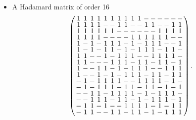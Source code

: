 \documentclass{beamer}
\begin{document}
\begin{frame}
  \begin{itemize}
  \item A Hadamard matrix of order 16
    \[
      \arraycolsep=1.0pt\def\arraystretch{0.75}
      \left(\begin{array}{cccccccccccccccc}
              1&1&1&1&1&1&1&1&1&1&-&-&-&-&-&-\\
              1&1&1&1&-&-&1&1&-&-&1&1&-&-&1&1\\
              1&1&1&1&1&1&-&-&-&-&-&-&1&1&1&1\\
              1&1&1&1&-&-&-&-&1&1&1&1&1&1&-&-\\
              1&-&1&-&1&1&1&-&1&-&1&1&1&-&-&1\\
              1&-&1&-&1&1&-&1&-&1&1&1&-&1&1&-\\
              1&1&-&-&1&-&1&1&1&-&-&1&1&1&1&-\\
              1&1&-&-&-&1&1&1&-&1&1&-&1&1&-&1\\
              1&-&-&1&1&-&1&-&1&1&1&-&-&1&1&1\\
              1&-&-&1&-&1&-&1&1&1&-&1&1&-&1&1\\
              -&1&-&1&1&1&1&-&-&1&1&1&1&-&1&-\\
              -&1&-&1&1&1&-&1&1&-&1&1&-&1&-&1\\
              -&-&1&1&-&1&1&1&1&-&1&-&1&1&1&-\\
              -&-&1&1&1&-&1&1&-&1&-&1&1&1&-&1\\
              -&1&1&-&1&-&-&1&1&1&1&-&1&-&1&1\\
              -&1&1&-&-&1&1&-&1&1&-&1&-&1&1&1\\
            \end{array}\right).
    \]
  \end{itemize}
\end{frame}
\end{document}
